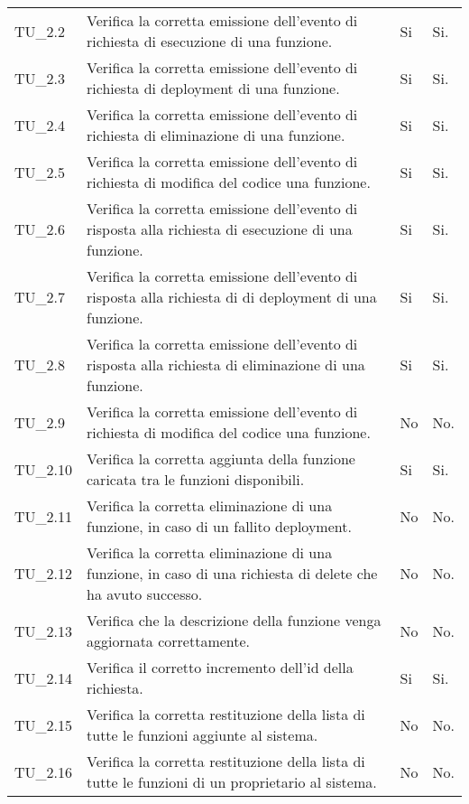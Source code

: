 \begin{longtable}{
		>{\centering}p{}
		>{}p{}
		>{\centering}p{}
		>{\centering}p{} }
		TU_2.2   &  Verifica la corretta emissione dell'evento di richiesta di esecuzione di una funzione. &
		Si & Si. \tabularnewline

		TU_2.3   &  Verifica la corretta emissione dell'evento di richiesta di deployment di una funzione. &
		Si & Si. \tabularnewline

		TU_2.4   &  Verifica la corretta emissione dell'evento di richiesta di eliminazione di una funzione. &
		Si & Si. \tabularnewline

		TU_2.5   &  Verifica la corretta emissione dell'evento di richiesta di modifica del codice una funzione. &
		Si & Si. \tabularnewline

		TU_2.6   &  Verifica la corretta emissione dell'evento di risposta alla richiesta di esecuzione di una funzione. &
		Si & Si. \tabularnewline

		TU_2.7   &  Verifica la corretta emissione dell'evento di risposta alla richiesta di di deployment di una funzione. &
		Si & Si. \tabularnewline

		TU_2.8   &  Verifica la corretta emissione dell'evento di risposta alla richiesta di eliminazione di una funzione. &
		Si & Si. \tabularnewline

		TU_2.9   &  Verifica la corretta emissione dell'evento di richiesta di modifica del codice una funzione. &
		No & No. \tabularnewline

		TU_2.10  &  Verifica la corretta aggiunta della funzione caricata tra le funzioni disponibili. &
		Si & Si. \tabularnewline

		TU_2.11  &  Verifica la corretta eliminazione di una funzione, in caso di un fallito deployment. &
		No & No. \tabularnewline

		TU_2.12  &  Verifica la corretta eliminazione di una funzione, in caso di una richiesta di delete che ha avuto successo. &
		No & No. \tabularnewline

		TU_2.13  &  Verifica che la descrizione della funzione venga aggiornata correttamente. &
		No & No. \tabularnewline

		TU_2.14  &  Verifica il corretto incremento dell'id della richiesta. &
		Si & Si. \tabularnewline

		TU_2.15  &  Verifica la corretta restituzione della lista di tutte le funzioni aggiunte al sistema. &
		No & No. \tabularnewline

		TU_2.16  &  Verifica la corretta restituzione della lista di tutte le funzioni di un proprietario al sistema. &
		No & No. \tabularnewline


\end{longtable}
